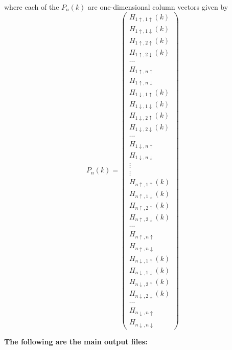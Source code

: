 \documentclass[a4paper]{article}
\begin{document}
\begin{itemize}
where each of the $P_n(k)$ are one-dimensional column vectors given by 
\begin{equation}
P_{n}(k) =
 \begin{pmatrix}
H_{1\uparrow,1\uparrow}(k) \\ H_{1\uparrow,1\downarrow}(k)\\ H_{1\uparrow,2\uparrow}(k)\\ H_{1\uparrow,2\downarrow}(k) \\ \cdots \\ H_{1\uparrow,n\uparrow} \\ H_{1\uparrow,n\downarrow} \\
H_{1\downarrow,1\uparrow}(k) \\ H_{1\downarrow,1\downarrow}(k)\\ H_{1\downarrow,2\uparrow}(k) \\ H_{1\downarrow,2\downarrow}(k) \\ \cdots \\ H_{1\downarrow,n\uparrow} \\ H_{1\downarrow,n\downarrow} \\
  \vdots  \\ \vdots  \\
H_{n\uparrow,1\uparrow}(k) \\ H_{n\uparrow,1\downarrow}(k)\\    H_{n\uparrow,2\uparrow}(k)\\ H_{n\uparrow,2\downarrow}(k)\\ \cdots \\ H_{n\uparrow,n\uparrow} \\ H_{n\uparrow,n\downarrow} \\
H_{n\downarrow,1\uparrow}(k) \\ H_{n\downarrow,1\downarrow}(k) \\ H_{n\downarrow,2\uparrow}(k) \\   H_{n\downarrow,2\downarrow}(k) \\ \cdots \\ H_{n\downarrow,n\uparrow} \\ H_{n\downarrow,n\downarrow} 
\end{pmatrix}
\end{equation}
\end{itemize}



\textbf{The following are the main output files:}
\end{document}
